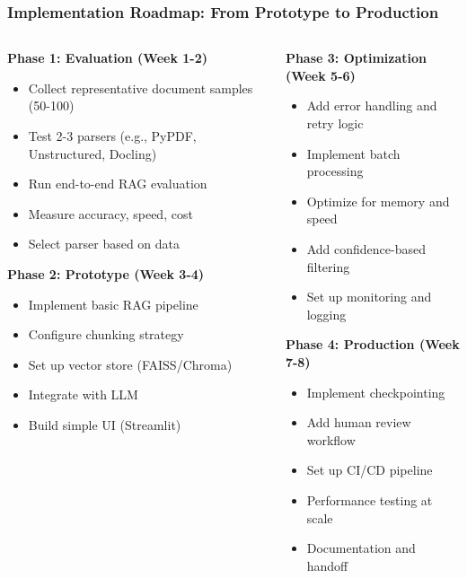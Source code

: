 \begin{frame}[fragile]\frametitle{Implementation Roadmap: From Prototype to Production}
\begin{columns}
    \begin{column}[T]{0.5\linewidth}
      \textbf{Phase 1: Evaluation (Week 1-2)}
      \begin{itemize}
        \item Collect representative document samples (50-100)
        \item Test 2-3 parsers (e.g., PyPDF, Unstructured, Docling)
        \item Run end-to-end RAG evaluation
        \item Measure accuracy, speed, cost
        \item Select parser based on data
      \end{itemize}
      
      \textbf{Phase 2: Prototype (Week 3-4)}
      \begin{itemize}
        \item Implement basic RAG pipeline
        \item Configure chunking strategy
        \item Set up vector store (FAISS/Chroma)
        \item Integrate with LLM
        \item Build simple UI (Streamlit)
      \end{itemize}
    \end{column}
    \begin{column}[T]{0.5\linewidth}
      \textbf{Phase 3: Optimization (Week 5-6)}
      \begin{itemize}
        \item Add error handling and retry logic
        \item Implement batch processing
        \item Optimize for memory and speed
        \item Add confidence-based filtering
        \item Set up monitoring and logging
      \end{itemize}
      
      \textbf{Phase 4: Production (Week 7-8)}
      \begin{itemize}
        \item Implement checkpointing
        \item Add human review workflow
        \item Set up CI/CD pipeline
        \item Performance testing at scale
        \item Documentation and handoff
      \end{itemize}
    \end{column}
\end{columns}
\end{frame}

